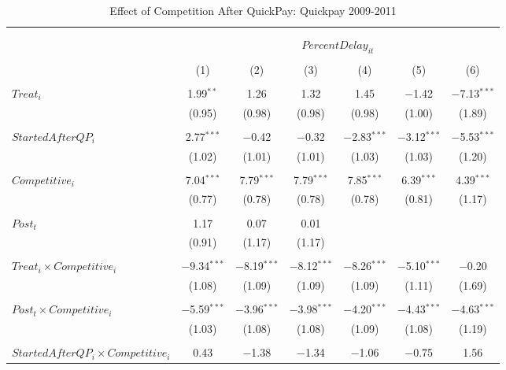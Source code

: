 \documentclass[
]{article}
\begin{document}
\begin{table}[H] \centering 
  \caption{Effect of Competition After QuickPay: Quickpay 2009-2011} 
  \label{} 
\small 
\begin{tabular}{@{\extracolsep{-3pt}}lcccccc} 
\\[-1.8ex]\hline 
\hline \\[-1.8ex] 
\\[-1.8ex] & \multicolumn{6}{c}{$PercentDelay_{it}$  } \\ 
\\[-1.8ex] & (1) & (2) & (3) & (4) & (5) & (6)\\ 
\hline \\[-1.8ex] 
 $Treat_i$ & 1.99$^{**}$ & 1.26 & 1.32 & 1.45 & $-$1.42 & $-$7.13$^{***}$ \\ 
  & (0.95) & (0.98) & (0.98) & (0.98) & (1.00) & (1.89) \\ 
  & & & & & & \\ 
 $StartedAfterQP_i$ & 2.77$^{***}$ & $-$0.42 & $-$0.32 & $-$2.83$^{***}$ & $-$3.12$^{***}$ & $-$5.53$^{***}$ \\ 
  & (1.02) & (1.01) & (1.01) & (1.03) & (1.03) & (1.20) \\ 
  & & & & & & \\ 
 $Competitive_i$ & 7.04$^{***}$ & 7.79$^{***}$ & 7.79$^{***}$ & 7.85$^{***}$ & 6.39$^{***}$ & 4.39$^{***}$ \\ 
  & (0.77) & (0.78) & (0.78) & (0.78) & (0.81) & (1.17) \\ 
  & & & & & & \\ 
 $Post_t$ & 1.17 & 0.07 & 0.01 &  &  &  \\ 
  & (0.91) & (1.17) & (1.17) &  &  &  \\ 
  & & & & & & \\ 
 $Treat_i \times Competitive_i$ & $-$9.34$^{***}$ & $-$8.19$^{***}$ & $-$8.12$^{***}$ & $-$8.26$^{***}$ & $-$5.10$^{***}$ & $-$0.20 \\ 
  & (1.08) & (1.09) & (1.09) & (1.09) & (1.11) & (1.69) \\ 
  & & & & & & \\ 
 $Post_t \times Competitive_i$ & $-$5.59$^{***}$ & $-$3.96$^{***}$ & $-$3.98$^{***}$ & $-$4.20$^{***}$ & $-$4.43$^{***}$ & $-$4.63$^{***}$ \\ 
  & (1.03) & (1.08) & (1.08) & (1.09) & (1.08) & (1.19) \\ 
  & & & & & & \\ 
 $StartedAfterQP_i \times Competitive_i$ & 0.43 & $-$1.38 & $-$1.34 & $-$1.06 & $-$0.75 & 1.56 \\ 

\end{tabular}
\end{table}
\end{document}
